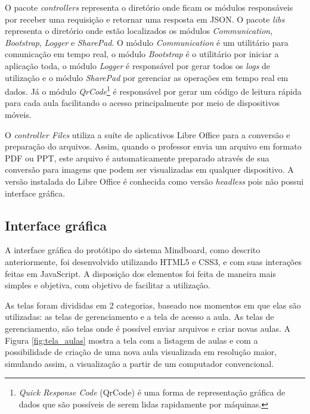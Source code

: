 O pacote \emph{controllers} representa o diretório onde ficam os módulos responsáveis por receber uma requisição e retornar uma resposta em JSON. O pacote \emph{libs} representa o diretório onde estão localizados os módulos \emph{Communication}, \emph{Bootstrap}, \emph{Logger} e \emph{SharePad}. O módulo \emph{Communication} é um utilitário para comunicação em tempo real, o módulo \emph{Bootstrap} é o utilitário por iniciar a aplicação toda, o módulo \emph{Logger} é responsável por gerar todos os \emph{logs} de utilização e o módulo \emph{SharePad} por gerenciar as operações em tempo real em dados. Já o módulo \emph{QrCode}\footnote{\emph{Quick Response Code} (QrCode) é uma forma de representação gráfica de dados que são possíveis de serem lidas rapidamente por máquinas.}  é responsável por gerar um código de leitura rápida para cada aula facilitando o acesso principalmente por meio de dispositivos móveis.



O \emph{controller Files} utiliza a suíte de aplicativos Libre Office para a conversão e preparação do arquivos. Assim, quando o professor envia um arquivo em formato PDF ou PPT, este arquivo é automaticamente preparado através de sua conversão para imagens que podem ser visualizadas em qualquer dispositivo. A versão instalada do Libre Office é conhecida como versão \emph{headless} pois não possui interface gráfica.

\subsection{Interface gráfica}
\label{sec:interface_grafica}

A interface gráfica do protótipo do sistema Mindboard, como descrito anteriormente, foi desenvolvido utilizando HTML5 e CSS3, e com suas interações feitas em JavaScript. A disposição dos elementos foi feita de maneira mais simples e objetiva, com objetivo de facilitar a utilização.

As telas foram divididas em 2 categorias, baseado nos momentos em que elas são utilizadas: as telas de gerenciamento e a tela de acesso a aula. As telas de gerenciamento, são telas onde é possível enviar arquivos e criar novas aulas. A Figura \ref{fig:tela_aulas} mostra a tela com a listagem de aulas e com a possibilidade de criação de uma nova aula visualizada em resolução maior, simulando assim, a visualização a partir de um computador convencional.

